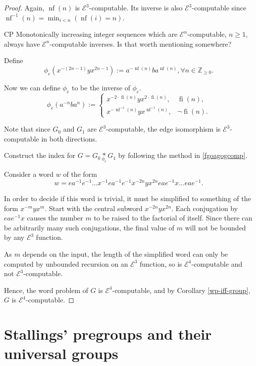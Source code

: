 \documentclass[a4paper]{article}
\newcommand{\grz}[1]{$\mathcal{E}^{#1}$}	%
\newcommand{\ZZ}{\mathbb{Z}}
\theoremstyle{plain}
\theoremstyle{definition}
\newenvironment{cpe}{\noindent\color{OliveGreen} CP }{}
\newcommand{\cp}[1]{
\begin{cpe} #1 \end{cpe}}
\begin{document}
\begin{proof}
Again, $\operatorname{nf}(n)$ is \grz{3}-computable. Its inverse is also \grz{3}-computable since $\operatorname{nf}^{-1}(n) = \min_{i<n} (\operatorname{nf}(i) = n)$.

\cp{Monotonically increasing integer sequences which are \grz{n}-computable, $n \geq 1$, always have \grz{n}-computable inverses. Is that worth mentioning somewhere?}

Define
\[ \phi_{e}(x^{-(2n-1)}yx^{2n-1}) := a^{-\operatorname{nf}(n)}ba^{\operatorname{nf}(n)}, \forall n \in \ZZ_{\geq 0}. \]

Now we can define $\phi_{\bar{e}}$ to be the inverse of $\phi_e$.
\[ 
	\phi_{\bar{e}}(a^{-n}ba^n) := 
		\begin{cases}
			x^{-2 \cdot \operatorname{fi}(n)}yx^{2 \cdot \operatorname{fi}(n)}, & \operatorname{fi}(n), \\
			x^{-\operatorname{nf}^{-1}(n)}yx^{\operatorname{nf}^{-1}(n)}, & \neg \operatorname{fi}(n).
		\end{cases}
\]

Note that since $G_0$ and $G_1$ are \grz{3}-computable, the edge isomorphism is \grz{3}-computable in both directions.

Construct the index for $G = G_0 \underset{\phi_e}{\ast} G_1$ by following the method in \ref{fgoagogcomp}.

Consider a word $w$ of the form
\[ w = ea^{-1}e^{-1} \dots x^{-1}ea^{-1}e^{-1}x^{-2n}yx^{2n}eae^{-1}x \dots eae^{-1}. \]

In order to decide if this word is trivial, it must be simplified to something of the form $x^{-m}yx^m$. Start with the central subword $x^{-2n}yx^{2n}$. Each conjugation by $eae^{-1}x$ causes the number $m$ to be raised to the factorial of itself. Since there can be arbitrarily many such conjugations, the final value of $m$ will not be bounded by any \grz{3} function.

As $m$ depends on the input, the length of the simplified word can only be computed by unbounded recursion on an \grz{3} function, so is \grz{4}-computable and not \grz{3}-computable. 

Hence, the word problem of $G$ is \grz{4}-computable, and by Corollary \ref{wp-iff-group}, $G$ is \grz{4}-computable. 
\end{proof}

\section{Stallings' pregroups and their universal groups}
\label{sec:pregroup}
\end{document}
